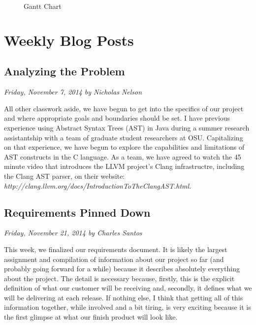 \documentclass[11pt]{scrreprt}
\begin{document}
\begin{figure}[ht]
  \caption{Gantt Chart}
  \label{fig:gantt}
\end{figure}

\chapter{Weekly Blog Posts}

\section{Analyzing the Problem}
\textit{Friday, November 7, 2014 by Nicholas Nelson}
\newline

All other classwork aside, we have begun to get into the specifics of our project and where appropriate goals and boundaries should be set. I have previous experience using Abstract Syntax Trees (AST) in Java during a summer research assistantship with a team of graduate student researchers at OSU. Capitalizing on that experience, we have begun to explore the capabilities and limitations of AST constructs in the C language. As a team, we have agreed to watch the 45 minute video that introduces the LLVM project's Clang infrastructre, including the Clang AST parser, on their website: \textit{http://clang.llvm.org/docs/IntroductionToTheClangAST.html}.

\section{Requirements Pinned Down}
\textit{Friday, November 21, 2014 by Charles Santos}
\newline

This week, we finalized our requirements document. It is likely the largest assignment and compilation of information about our project so far (and probably going forward for a while) because it describes absolutely everything about the project.
The detail is necessary because, firstly, this is the explicit definition of what our customer will be receiving and, secondly, it defines what we will be delivering at each release.
If nothing else, I think that getting all of this information together, while involved and a bit tiring, is very exciting because it is the first glimpse at what our finish product will look like.
\end{document}
